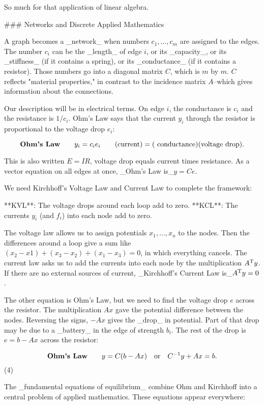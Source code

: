 So much for that application of linear algebra.

### Networks and Discrete Applied Mathematics

A graph becomes a _network_ when numbers \(c_{1},\ldots,c_{m}\) are assigned to the edges. The number \(c_{i}\) can be the _length_ of edge \(i\), or its _capacity_, or its _stiffness_ (if it contains a spring), or its _conductance_ (if it contains a resistor). Those numbers go into a diagonal matrix \(C\), which is \(m\) by \(m\). \(C\) reflects "material properties," in contrast to the incidence matrix \(A\)--which gives information about the connections.

Our description will be in electrical terms. On edge \(i\), the conductance is \(c_{i}\) and the resistance is \(1/c_{i}\). Ohm's Law says that the current \(y_{i}\) through the resistor is proportional to the voltage drop \(e_{i}\):

\[\mbox{\bf Ohm's Law}\qquad y_{i}=c_{i}e_{i}\qquad\mbox{(current)}=\mbox{( conductance)(voltage drop).}\]

This is also written \(E=IR\), voltage drop equals current times resistance. As a vector equation on all edges at once, _Ohm's Law is_\(y=Ce\).

We need Kirchhoff's Voltage Law and Current Law to complete the framework:

**KVL**: The voltage drops around each loop add to zero.
**KCL**: The currents \(y_{i}\) (and \(f_{i}\)) into each node add to zero.

The voltage law allows us to assign potentials \(x_{1},\ldots,x_{n}\) to the nodes. Then the differences around a loop give a sum like \((x_{2}-x1)+(x_{3}-x_{2})+(x_{1}-x_{3})=0\), in which everything cancels. The current law asks us to add the currents into each node by the multiplication \(A^{\rm T}y\). If there are no external sources of current, _Kirchhoff's Current Law is_\(A^{\rm T}y=0\).

The other equation is Ohm's Law, but we need to find the voltage drop \(e\) across the resistor. The multiplication \(Ax\) gave the potential difference between the nodes. Reversing the signs, \(-Ax\) gives the _drop_ in potential. Part of that drop may be due to a _battery_ in the edge of strength \(b_{i}\). The rest of the drop is \(e=b-Ax\) across the resistor:

\[\mbox{\bf Ohm's Law}\qquad y=C(b-Ax)\quad\mbox{or}\quad C^{-1}y+Ax=b.\] (4)

The _fundamental equations of equilibrium_ combine Ohm and Kirchhoff into a central problem of applied mathematics. These equations appear everywhere:

